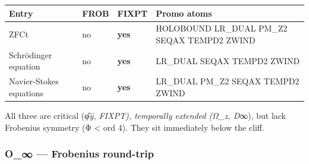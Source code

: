 {\def\LTcaptype{none} %
\begin{longtable}[]{@{}
  >{\raggedright\arraybackslash}p{}
  >{\raggedright\arraybackslash}p{}
  >{\raggedright\arraybackslash}p{}
  >{\raggedright\arraybackslash}p{}@{}}
\toprule\noalign{}
\begin{minipage}[b]{\linewidth}\raggedright
Entry
\end{minipage} & \begin{minipage}[b]{\linewidth}\raggedright
FROB
\end{minipage} & \begin{minipage}[b]{\linewidth}\raggedright
FIXPT
\end{minipage} & \begin{minipage}[b]{\linewidth}\raggedright
Promo atoms
\end{minipage} \\
\midrule\noalign{}
\endhead
\bottomrule\noalign{}
\endlastfoot
ZFCt & no & \textbf{yes} & HOLOBOUND LR\_DUAL PM\_Z2 SEQAX TEMPD2
ZWIND \\
Schrödinger equation & no & \textbf{yes} & LR\_DUAL SEQAX TEMPD2
ZWIND \\
Navier-Stokes equations & no & \textbf{yes} & LR\_DUAL PM\_Z2 SEQAX
TEMPD2 ZWIND \\
\end{longtable}
}

All three are critical (φ̂\emph{ÿ, FIXPT), temporally extended (Ω\_z,
D}∞), but lack Frobenius symmetry (Φ \textless{} ord 4). They sit
immediately below the cliff.

\subsubsection{O\_∞ --- Frobenius
round-trip}\label{o_-frobenius-round-trip}

